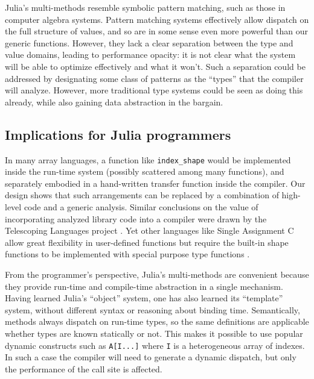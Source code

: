 \documentclass{sigplanconf}
\newcommand{\code}[1]{\texttt{#1}}
\begin{document}
Julia's multi-methods resemble symbolic pattern matching, such as those in
computer algebra systems. Pattern matching systems effectively
allow dispatch on the full structure of values, and so are in some sense
even more powerful than our generic functions. However, they lack a clear
separation between the type and value domains, leading to performance
opacity: it is not clear what the system will be able to optimize
effectively and what it won't.
Such a separation could be addressed by
designating some class of patterns as the ``types'' that the compiler
will analyze. However, more traditional type systems could be seen as
doing this already, while also gaining data abstraction in the bargain.

\subsection{Implications for Julia programmers}

In many array languages, a function like
\code{index\_shape} would be implemented inside the run-time system
(possibly scattered among many functions), and separately embodied in
a hand-written transfer function inside the compiler. Our design shows
that such arrangements can be replaced by a combination of high-level code and
a generic analysis. Similar conclusions on the value of incorporating analyzed library code into a
compiler were drawn by the Telescoping Languages project \cite{telescoping}.
Yet other languages like Single Assignment C allow great flexibility in
user-defined functions but require the built-in shape functions to be
implemented with special purpose type functions
\cite{Scholz:2003sa,Grelck:2006sa}.

From the programmer's perspective, Julia's multi-methods are convenient
because they provide run-time and compile-time abstraction in a single
mechanism. Having learned Julia's ``object'' system, one has also learned
its ``template'' system, without different syntax or reasoning about
binding time. Semantically, methods always dispatch on run-time
types, so the same definitions are applicable whether types are known
statically or not. This makes it possible to use popular
dynamic constructs such as \code{A[I...]} where \code{I} is a heterogeneous
array of indexes. In such a case the compiler will need to generate a
dynamic dispatch, but only the performance of the call site is affected.
\end{document}
